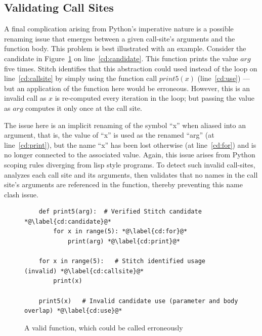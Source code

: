 \subsection{Validating Call Sites} %
A final complication arising from Python's imperative nature is a possible renaming issue that emerges between a given call-site's arguments and the function body.
This problem is best illustrated with an example. Consider the candidate  in Figure~\ref{fig:possible-invalid-function-call} on line~\ref{cd:candidate}. This function prints the value $arg$ five times. Stitch identifies that this abstraction could used instead of the loop on line~\ref{cd:callsite} by simply using the function call $print5(x)$ (line~\ref{cd:use}) --- but an application of the function here would be erroneous. 
However, this is an invalid call as $x$ is re-computed every iteration in the loop; but passing the value as $arg$ computes it only once at the call site. 

The issue here is an implicit renaming of the symbol ``x'' when aliased into an argument, that is, the value of ``x'' is used as the renamed ``arg'' (at line~\ref{cd:print}), but the name ``x'' has been lost otherwise (at line~\ref{cd:for}) and is no longer connected to the associated value.  Again, this issue arises from Python scoping rules diverging from lisp style programs.
To detect such invalid call-sites, \toolname analyzes each call site and its arguments, then validates that no names in the call site's arguments are referenced in the function, thereby preventing this name clash issue.

\begin{figure}
    \begin{lstlisting}
    def print5(arg):  # Verified Stitch candidate *@\label{cd:candidate}@*
        for x in range(5): *@\label{cd:for}@*
            print(arg) *@\label{cd:print}@*

    for x in range(5):   # Stitch identified usage (invalid) *@\label{cd:callsite}@*
        print(x)
        
    print5(x)   # Invalid candidate use (parameter and body overlap) *@\label{cd:use}@*
    \end{lstlisting}
    \caption{A valid function, which could be called erroneously}
    \label{fig:possible-invalid-function-call}
\end{figure}



